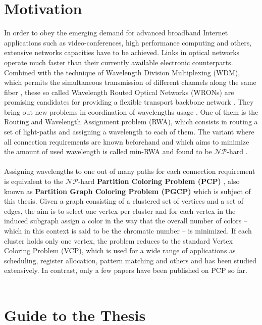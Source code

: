 \section{Motivation}

In order to obey the emerging demand for advanced broadband Internet applications such as video-conferences, high performance computing and others, extensive networks capacities have to be achieved. Links in optical networks operate much faster than their currently available electronic counterparts. Combined with the technique of Wavelength Division Multiplexing (WDM), which permits the simultaneous transmission of different channels along the same fiber \cite{noronha-06}, these so called Wavelength Routed Optical Networks (WRONs) are promising candidates for providing a flexible transport backbone network \cite{krishnaswamy-01}. They bring out new problems in coordination of wavelengths usage \cite{murthy-02}. One of them is the Routing and Wavelength Assignment problem (RWA), which consists in routing a set of light-paths and assigning a wavelength to each of them. The variant where all connection requirements are known beforehand and which aims to minimize the amount of used wavelength is called min-RWA and found to be $\mathcal{NP}$-hard \cite{erlebach-01}.\\\\
Assigning wavelengths to one out of many paths for each connection requirement is equivalent to the $\mathcal{NP}$-hard \textbf{Partition Coloring Problem (PCP)} \cite{li-00}, also known as \textbf{Partition Graph Coloring Problem (PGCP)} which is subject of this thesis. Given a graph consisting of a clustered set of vertices and a set of edges, the aim is to select one vertex per cluster and for each vertex in the induced subgraph assign a color in the way that the overall number of colors -- which in this context is said to be the chromatic number -- is minimized. If each cluster holds only one vertex, the problem reduces to the standard Vertex Coloring Problem (VCP), which is used for a wide range of applications as scheduling, register allocation, pattern matching and others and has been studied extensively. In contrast, only a few papers have been published on PCP so far.\\\\


\section{Guide to the Thesis}

